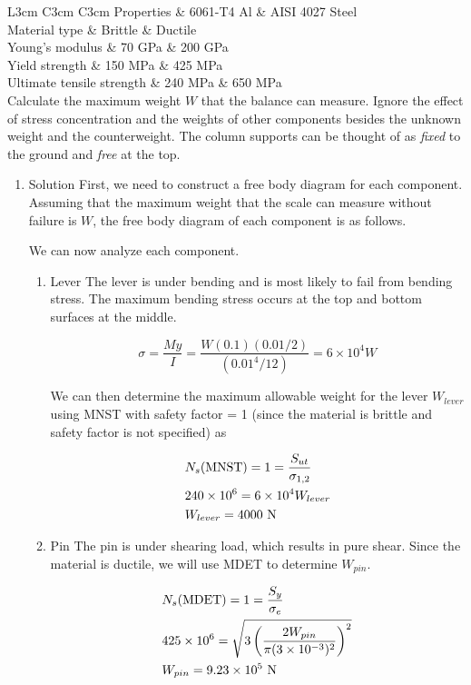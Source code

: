 \documentclass[a4paper,openany,12pt]{book}
\begin{document}
{{ L3cm C3cm C3cm Properties \& 6061-T4 Al \& AISI 4027 Steel\\
Material type \& Brittle \& Ductile\\
Young's modulus \& 70 GPa \& 200 GPa\\
Yield strength \& 150 MPa \& 425 MPa\\
Ultimate tensile strength \& 240 MPa \& 650 MPa\\

Calculate the maximum weight \(W\) that the balance can measure. Ignore
the effect of stress concentration and the weights of other components
besides the unknown weight and the counterweight. The column supports
can be thought of as \emph{fixed} to the ground and \emph{free} at the top.

\begin{enumerate}
\item Solution
\label{solution}
First, we need to construct a free body diagram for each component.
Assuming that the maximum weight that the scale can measure without
failure is \(W\), the free body diagram of each component is as follows.


We can now analyze each component.

\begin{enumerate}
\item Lever
\label{lever}
The lever is under bending and is most likely to fail from bending
stress. The maximum bending stress occurs at the top and bottom surfaces
at the middle.

$$\sigma  = \frac{My}{I} = \frac{W(0.1)(0.01/2)}{(0.01^4/12)} = 6 \times
  10^4W$$

We can then determine the maximum allowable weight for the lever
\(W_{lever}\) using MNST with safety factor = 1 (since the material is
brittle and safety factor is not specified) as

$$\begin{gathered}
  N_s\text{(MNST)} = 1 = \frac{S_{ut}}{\sigma _{1,2}} \hfill \\
  240 \times {10^6} = 6 \times 10^4W_{lever} \hfill \\
  W_{lever} = 4000\text{ N} \hfill \\ 
\end{gathered}$$

\item Pin
\label{pin}
The pin is under shearing load, which results in pure shear. Since the
material is ductile, we will use MDET to determine \(W_{pin}\).

$$\begin{gathered}
  N_s\text{(MDET)} = 1 = \frac{S_y}{\sigma_e} \hfill \\
  425 \times 10^6 = \sqrt {3\left( \frac{2W_{pin}}{\pi (3 \times 10^{-3})^2} \right)^2}  \hfill \\
  W_{pin} = 9.23 \times 10^5\text{ N} \hfill \\ 
\end{gathered}$$


\end{enumerate}
\end{enumerate}}}
\end{document}
